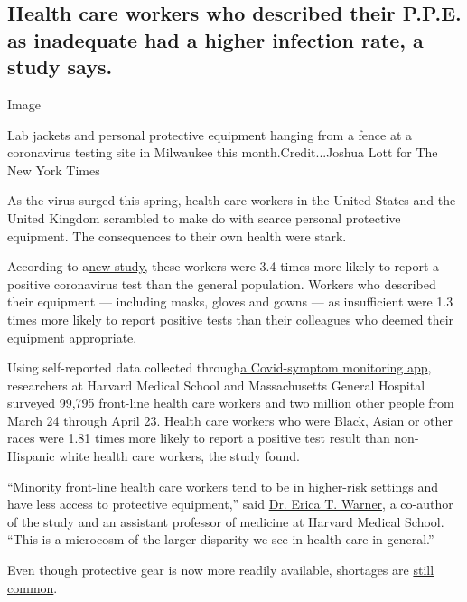 \hypertarget{health-care-workers-who-described-their-ppe-as-inadequate-had-a-higher-infection-rate-a-study-says}{%
\subsection{Health care workers who described their P.P.E. as inadequate
had a higher infection rate, a study
says.}\label{health-care-workers-who-described-their-ppe-as-inadequate-had-a-higher-infection-rate-a-study-says}}

Image

Lab jackets and personal protective equipment hanging from a fence at a
coronavirus testing site in Milwaukee this month.Credit...Joshua Lott
for The New York Times

As the virus surged this spring, health care workers in the United
States and the United Kingdom scrambled to make do with scarce personal
protective equipment. The consequences to their own health were stark.

According to
a\href{https://www.thelancet.com/journals/lanpub/article/PIIS2468-2667(20)30164-X/fulltext}{new
study,} these workers were 3.4 times more likely to report a positive
coronavirus test than the general population. Workers who described
their equipment --- including masks, gloves and gowns --- as
insufficient were 1.3 times more likely to report positive tests than
their colleagues who deemed their equipment appropriate.

Using self-reported data collected
through\href{https://covid.joinzoe.com/us}{a Covid-symptom monitoring
app}, researchers at Harvard Medical School and Massachusetts General
Hospital surveyed 99,795 front-line health care workers and two million
other people from March 24 through April 23. Health care workers who
were Black, Asian or other races were 1.81 times more likely to report a
positive test result than non-Hispanic white health care workers, the
study found.

``Minority front-line health care workers tend to be in higher-risk
settings and have less access to protective equipment,'' said
\href{https://cgvh.harvard.edu/people/erica-warner}{Dr. Erica T.
Warner,} a co-author of the study and an assistant professor of medicine
at Harvard Medical School. ``This is a microcosm of the larger disparity
we see in health care in general.''

Even though protective gear is now more readily available, shortages are
\href{https://www.nytimes.com/2020/07/08/health/coronavirus-masks-ppe-doc.html}{still
common}.

